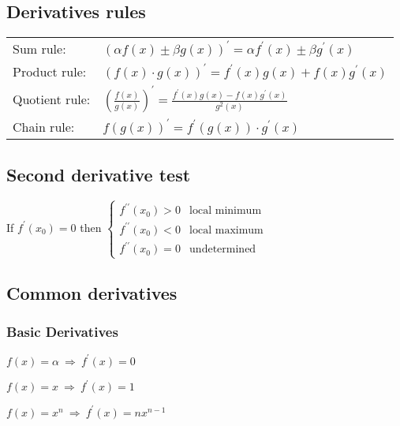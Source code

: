 \subsection{Derivatives rules}
\begin{tabular}{ l l }
Sum rule:      & $ \displaystyle (\alpha f(x) \pm \beta g(x) )^\prime = \alpha f^\prime(x) \pm \beta g^\prime(x) $  \\
Product rule:  & $ \displaystyle (f(x) \cdot g(x) )^\prime = f^\prime(x) g(x) + f(x) g^\prime(x) $ \\
Quotient rule: & $ \displaystyle \left( \frac{f(x)}{g(x)} \right)^\prime = \frac{ f^\prime(x) g(x) - f(x) g^\prime(x) }{ g^2(x) } $ \\
Chain rule:    & $ \displaystyle f\left( g(x) \right) ^\prime = f^\prime\left( g(x) \right) \cdot g^\prime(x) $
\end{tabular}


\subsection{Second derivative test}

If $ f^\prime(x_0) = 0 $ then $ \begin{cases}
									f^{\prime\prime}(x_0) > 0 & \text{local minimum} \\
									f^{\prime\prime}(x_0) < 0 & \text{local maximum} \\
									f^{\prime\prime}(x_0) = 0 & \text{undetermined}
								\end{cases}
$

\subsection{Common derivatives}
\subsubsection{Basic Derivatives}
$ \displaystyle f(x)=\alpha ~ \Rightarrow ~ f^\prime(x)=0 $

$ \displaystyle f(x)=x ~ \Rightarrow ~ f^\prime(x)=1 $

$ \displaystyle f(x)=x^n ~ \Rightarrow ~ f^\prime(x)=n x^{n-1} $

